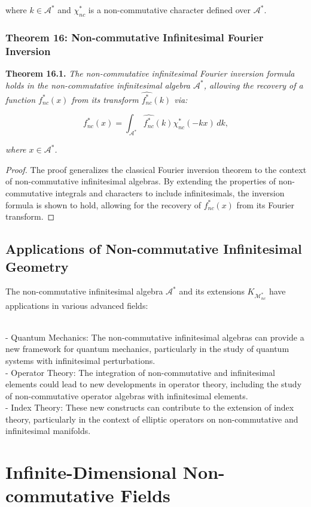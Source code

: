 \documentclass{article}
\begin{document}
where \(k \in \mathcal{A}^*\) and \(\chi_{nc}^*\) is a non-commutative character defined over \(\mathcal{A}^*\).

\subsubsection{Theorem 16: Non-commutative Infinitesimal Fourier Inversion}
\textbf{Theorem 16.1.} \textit{The non-commutative infinitesimal Fourier inversion formula holds in the non-commutative infinitesimal algebra \(\mathcal{A}^*\), allowing the recovery of a function \(f_{nc}^*(x)\) from its transform \(\widehat{f_{nc}^*}(k)\) via:}

\[
f_{nc}^*(x) = \int_{\mathcal{A}^*} \widehat{f_{nc}^*}(k) \chi_{nc}^*(-kx) \, dk,
\]

\textit{where \(x \in \mathcal{A}^*\).}

\begin{proof}
The proof generalizes the classical Fourier inversion theorem to the context of non-commutative infinitesimal algebras. By extending the properties of non-commutative integrals and characters to include infinitesimals, the inversion formula is shown to hold, allowing for the recovery of \(f_{nc}^*(x)\) from its Fourier transform.
\end{proof}

\subsection{Applications of Non-commutative Infinitesimal Geometry}
The non-commutative infinitesimal algebra \(\mathcal{A}^*\) and its extensions \(K_{\mathcal{M}_{nc}^*}\) have applications in various advanced fields:

{\ }\\
- Quantum Mechanics: The non-commutative infinitesimal algebras can provide a new framework for quantum mechanics, particularly in the study of quantum systems with infinitesimal perturbations.
{\ }\\
- Operator Theory: The integration of non-commutative and infinitesimal elements could lead to new developments in operator theory, including the study of non-commutative operator algebras with infinitesimal elements.
{\ }\\
- Index Theory: These new constructs can contribute to the extension of index theory, particularly in the context of elliptic operators on non-commutative and infinitesimal manifolds.

\section{Infinite-Dimensional Non-commutative Fields}
\end{document}
